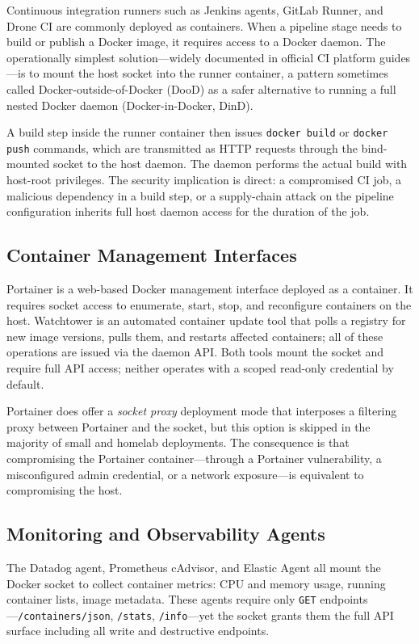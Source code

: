 Continuous integration runners such as Jenkins agents, GitLab Runner, and Drone CI
are commonly deployed as containers. When a pipeline stage needs to build or publish
a Docker image, it requires access to a Docker daemon. The operationally simplest
solution---widely documented in official CI platform guides---is to mount the host
socket into the runner container, a pattern sometimes called Docker-outside-of-Docker
(DooD) as a safer alternative to running a full nested Docker daemon
(Docker-in-Docker, DinD).

A build step inside the runner container then issues \texttt{docker build} or
\texttt{docker push} commands, which are transmitted as HTTP requests through the
bind-mounted socket to the host daemon. The daemon performs the actual build with
host-root privileges. The security implication is direct: a compromised CI job, a
malicious dependency in a build step, or a supply-chain attack on the pipeline
configuration inherits full host daemon access for the duration of the job.

\subsection{Container Management Interfaces}

Portainer is a web-based Docker management interface deployed as a container. It
requires socket access to enumerate, start, stop, and reconfigure containers on the
host. Watchtower is an automated container update tool that polls a registry for new
image versions, pulls them, and restarts affected containers; all of these operations
are issued via the daemon API. Both tools mount the socket and require full API
access; neither operates with a scoped read-only credential by default.

Portainer does offer a \textit{socket proxy} deployment mode that interposes a
filtering proxy between Portainer and the socket, but this option is skipped in
the majority of small and homelab deployments. The consequence is that compromising
the Portainer container---through a Portainer vulnerability, a misconfigured admin
credential, or a network exposure---is equivalent to compromising the host.

\subsection{Monitoring and Observability Agents}

The Datadog agent, Prometheus cAdvisor, and Elastic Agent all mount the Docker socket
to collect container metrics: CPU and memory usage, running container lists, image
metadata. These agents require only \texttt{GET} endpoints---\texttt{/containers/json},
\texttt{/stats}, \texttt{/info}---yet the socket grants them the full API surface
including all write and destructive endpoints.


